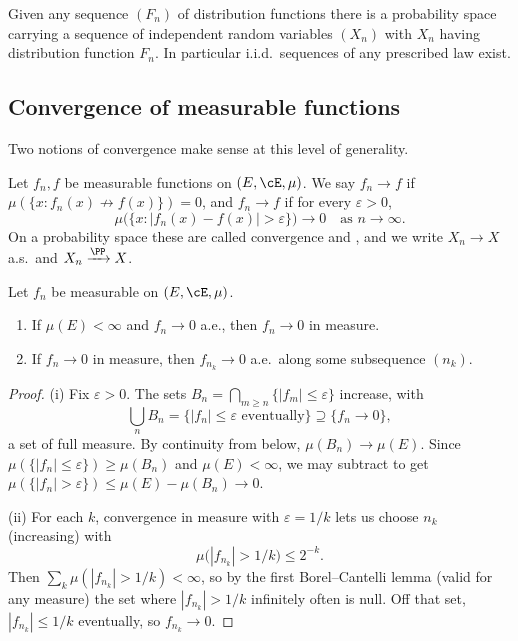 \begin{theorem}\label{thm:construct-iid}
	Given any sequence $(F_n)$ of distribution functions there is a probability space carrying a sequence of independent random variables $(X_n)$ with $X_n$ having distribution function $F_n$. In particular i.i.d.\ sequences of any prescribed law exist.
\end{theorem}

\subsection{Convergence of measurable functions}

Two notions of convergence make sense at this level of generality.

\begin{definition}
	Let $f_n, f$ be measurable functions on $(E,\cE,\mu)$. We say $f_n \to f$  if $\mu(\{x : f_n(x) \not\to f(x)\}) = 0$, and $f_n \to f$  if for every $\varepsilon > 0$,
	$$
	\mu\big( \{ x : |f_n(x) - f(x)| > \varepsilon\}\big) \to 0 \quad \text{as } n \to \infty.
	$$
	On a probability space these are called convergence  and , and we write $X_n \to X$ a.s.\ and $X_n \xrightarrow{\PP} X$.
\end{definition}

\begin{theorem}\label{thm:ae-vs-measure}
	Let $f_n$ be measurable on $(E,\cE,\mu)$.
	\begin{enumerate}[label=(\roman*)]
		\item If $\mu(E) < \infty$ and $f_n \to 0$ a.e., then $f_n \to 0$ in measure.
		\item If $f_n \to 0$ in measure, then $f_{n_k} \to 0$ a.e.\ along some subsequence $(n_k)$.
	\end{enumerate}
\end{theorem}
\begin{proof}
	(i) Fix $\varepsilon > 0$. The sets $B_n = \bigcap_{m \geq n} \{|f_m| \leq \varepsilon\}$ increase, with
	$$
	\bigcup_n B_n = \{|f_n| \leq \varepsilon \text{ eventually}\} \supseteq \{f_n \to 0\},
	$$
	a set of full measure. By continuity from below, $\mu(B_n) \to \mu(E)$. Since $\mu(\{|f_n| \leq \varepsilon\}) \geq \mu(B_n)$ and $\mu(E) < \infty$, we may subtract to get $\mu(\{|f_n| > \varepsilon\}) \leq \mu(E) - \mu(B_n) \to 0$.

	(ii) For each $k$, convergence in measure with $\varepsilon = 1/k$ lets us choose $n_k$ (increasing) with
	$$
	\mu\big( |f_{n_k}| > 1/k \big) \leq 2^{-k}.
	$$
	Then $\sum_k \mu(|f_{n_k}| > 1/k) < \infty$, so by the first Borel--Cantelli lemma (valid for any measure) the set where $|f_{n_k}| > 1/k$ infinitely often is null. Off that set, $|f_{n_k}| \leq 1/k$ eventually, so $f_{n_k}\to 0$.
\end{proof}

